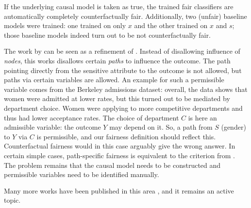If the underlying causal model is taken as true,
the trained fair classifiers are automatically completely counterfactually fair.
Additionally, two (unfair) baseline models were trained:
one trained on only \(x\) and the other trained on \(x\) and \(s\);
those baseline models indeed turn out to be not counterfactually fair.

The work by \citet{chiappa2019path} can be seen as a refinement of \citet{kilbertus2017avoiding}.
Instead of disallowing influence of \emph{nodes}, this works disallows certain \emph{paths} to influence the outcome.
The path pointing directly from the sensitive attribute to the outcome is not allowed,
but paths via certain variables are allowed.
An example for such a permissible variable comes from the Berkeley admissions dataset:
overall, the data shows that women were admitted at lower rates,
but this turned out to be mediated by department choice.
Women were applying to more competitive departments and thus had lower acceptance rates.
The choice of department \(C\) is here an admissible variable:
the outcome \(Y\) may depend on it.
So, a path from \(S\) (gender) to \(Y\) via \(C\) is permissible, and our fairness definition should reflect this.
Counterfactual fairness \citep{kusner2017counterfactual} would in this case arguably give the wrong answer.
In certain simple cases, path-specific fairness is equivalent to the criterion from \citet{kilbertus2017avoiding}.
The problem remains that the causal model needs to be constructed
and permissible variables need to be identified manually.

Many more works have been published in this area \citep[\eg,][]{wu2019pc,kilbertus2020sensitivity,creager2020causal},
and it remains an active topic.
%

